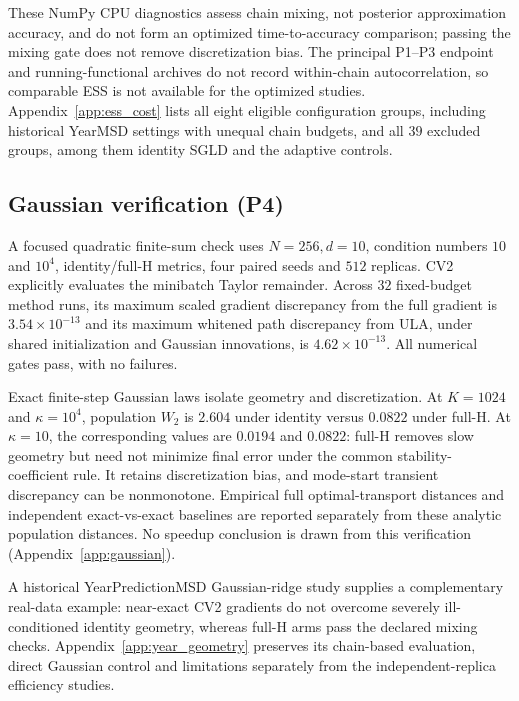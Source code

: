 These NumPy CPU diagnostics assess chain mixing, not posterior approximation accuracy, and do not form an optimized time-to-accuracy comparison; passing the mixing gate does not remove discretization bias. The principal P1--P3 endpoint and running-functional archives do not record within-chain autocorrelation, so comparable ESS is not available for the optimized studies. Appendix~\ref{app:ess_cost} lists all eight eligible configuration groups, including historical YearMSD settings with unequal chain budgets, and all $39$ excluded groups, among them identity SGLD and the adaptive controls.


\FloatBarrier
\subsection{Gaussian verification (P4)}\label{sec:exp_gaussian}
A focused quadratic finite-sum check uses $N=256,d=10$, condition numbers $10$ and $10^4$, identity/full-H metrics, four paired seeds and $512$ replicas. CV2 explicitly evaluates the minibatch Taylor remainder. Across $32$ fixed-budget method runs, its maximum scaled gradient discrepancy from the full gradient is $3.54\times10^{-13}$ and its maximum whitened path discrepancy from ULA, under shared initialization and Gaussian innovations, is $4.62\times10^{-13}$. All numerical gates pass, with no failures.

Exact finite-step Gaussian laws isolate geometry and discretization. At $K=1024$ and $\kappa=10^4$, population $W_2$ is $2.604$ under identity versus $0.0822$ under full-H. At $\kappa=10$, the corresponding values are $0.0194$ and $0.0822$: full-H removes slow geometry but need not minimize final error under the common stability-coefficient rule. It retains discretization bias, and mode-start transient discrepancy can be nonmonotone. Empirical full optimal-transport distances and independent exact-vs-exact baselines are reported separately from these analytic population distances. No speedup conclusion is drawn from this verification (Appendix~\ref{app:gaussian}).

A historical YearPredictionMSD Gaussian-ridge study supplies a complementary real-data example: near-exact CV2 gradients do not overcome severely ill-conditioned identity geometry, whereas full-H arms pass the declared mixing checks. Appendix~\ref{app:year_geometry} preserves its chain-based evaluation, direct Gaussian control and limitations separately from the independent-replica efficiency studies.

